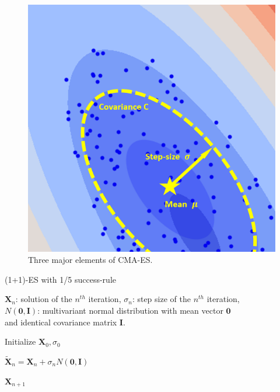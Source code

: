 \begin{figure}
\centering
\includegraphics[width=\textwidth]{CMA_elements}
\caption{Three major elements of CMA-ES.}\label{fig:CMA_elements}
\end{figure}


\begin{algorithm}%
\caption{(1+1)-ES with 1/5 success-rule}\label{algo:1+1ES}

$\boldsymbol{X}_{n}$: solution of the $n^{th}$ iteration, $\sigma_n$: step size of the $n^{th}$ iteration, \\
$N(\boldsymbol{0}, \boldsymbol{I})$: multivariant normal distribution with mean vector $\boldsymbol{0}$ \\ 
and identical covariance matrix $\boldsymbol{I}$.

\BlankLine
{} 

\BlankLine
Initialize $\boldsymbol{X}_0, \sigma_0$ \\
 {

    $\widetilde{\boldsymbol{X}}_n = \boldsymbol{X}_n + \sigma_n N(\boldsymbol{0}, \boldsymbol{I})$  \\

}

\Return $\boldsymbol{X}_{n+1}$

\end{algorithm}





